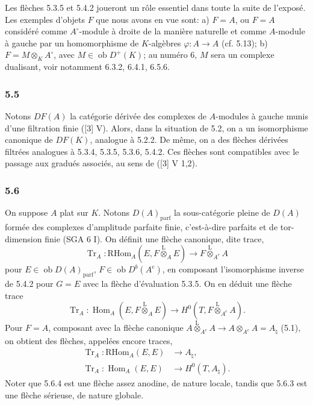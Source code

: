 \documentclass[11pt]{article}
\DeclareMathOperator{\Hom}{Hom}
\newcommand{\ob}{\operatorname{ob}}
\providecommand{\RHom}{\mathrm{RHom}}
\providecommand{\Tr}{\operatorname{Tr}}
\providecommand{\Tr}{\operatorname{Tr}}
\providecommand{\lten}{\overset{\mathrm L}{\otimes}}
\providecommand{\Tr}{\operatorname{Tr}}
\providecommand{\RHom}{\mathrm{RHom}}
\providecommand{\Hom}{\operatorname{Hom}}
\providecommand{\ob}{\operatorname{ob}}
\providecommand{\lten}{\overset{\mathrm L}{\otimes}}
\providecommand{\RHom}{\mathrm R\mathcal{H}om}
\providecommand{\lten}{\overset{\mathrm L}{\otimes}}
\providecommand{\Tr}{\operatorname{Tr}}
\providecommand{\lten}{\overset{\mathrm L}{\otimes}}
\providecommand{\lten}{\overset{\mathrm L}{\otimes}}
\providecommand{\lten}{\overset{\mathrm L}{\otimes}}
\providecommand{\RHom}{\mathrm{RHom}}
\providecommand{\Hom}{\operatorname{Hom}}
\providecommand{\Tr}{\operatorname{Tr}}
\providecommand{\lten}{\overset{\mathrm L}{\otimes}}
\begin{document}
Les flèches 5.3.5 et 5.4.2 joueront un rôle essentiel dans toute la suite de l'exposé. Les exemples d'objets $F$ que nous avons en vue sont: a) $F=A$, ou $F=A$ considéré comme $A^\circ$-module à droite de la manière naturelle et comme $A$-module à gauche par un homomorphisme de $K$-algèbres $\varphi:A\to A$ (cf. 5.13); b) $F=M\otimes_KA^\circ$, avec $M\in\ob D^+(K)$; au numéro 6, $M$ sera un complexe dualisant, voir notamment 6.3.2, 6.4.1, 6.5.6.

\subsubsection*{5.5}

Notons $DF(A)$ la catégorie dérivée des complexes de $A$-modules à gauche munis d'une filtration finie ([3] V). Alors, dans la situation de 5.2, on a un isomorphisme canonique de $DF(K)$, analogue à 5.2.2. De même, on a des flèches dérivées filtrées analogues à 5.3.4, 5.3.5, 5.3.6, 5.4.2. Ces flèches sont compatibles avec le passage aux gradués associés, au sens de ([3] V 1,2).

\subsubsection*{5.6}

On suppose $A$ plat sur $K$. Notons $D(A)_{\mathrm{parf}}$ la sous-catégorie pleine de $D(A)$ formée des complexes d'amplitude parfaite finie, c'est-à-dire parfaits et de tor-dimension finie (SGA 6 I). On définit une flèche canonique, dite trace,
\begin{equation}\tag{5.6.1}
\Tr_A:\RHom_A(E,F\lten_AE)\longrightarrow F\lten_{A^e}A
\end{equation}
pour $E\in\ob D(A)_{\mathrm{parf}}$, $F\in\ob D^b(A^e)$, en composant l'isomorphisme inverse de 5.4.2 pour $G=E$ avec la flèche d'évaluation 5.3.5. On en déduit une flèche trace
\begin{equation}\tag{5.6.2}
\Tr_A:\Hom_A(E,F\lten_AE)\longrightarrow H^0(T,F\lten_{A^e}A).
\end{equation}
Pour $F=A$, composant avec la flèche canonique $A\lten_{A^e}A\to A\otimes_{A^e}A=A_\natural$ (5.1), on obtient des flèches, appelées encore traces,
\begin{align}
\Tr_A:\RHom_A(E,E)&\longrightarrow A_\natural,\tag{5.6.3}\\
\Tr_A:\Hom_A(E,E)&\longrightarrow H^0(T,A_\natural).\tag{5.6.4}
\end{align}
Noter que 5.6.4 est une flèche assez anodine, de nature locale, tandis que 5.6.3 est une flèche sérieuse, de nature globale.
\end{document}

